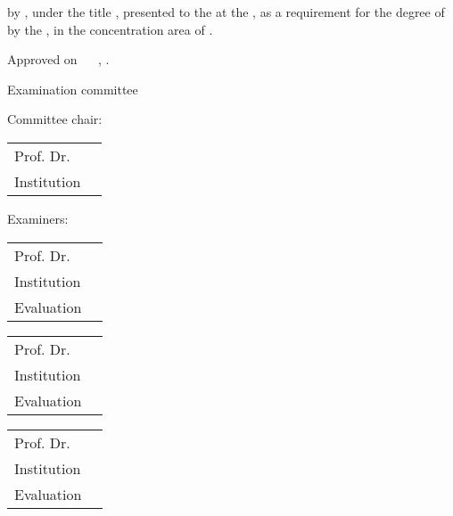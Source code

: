 
\begin{folhadeaprovacao}[\folhadeaprovacaoname]
{\imprimirtipotrabalho} by {\imprimirautor}, under the title \textbf{\imprimirtitulo}, presented to the {\imprimirescola} at the {\imprimiruniversidade}, as a requirement for the degree of {\imprimirtituloacademico} by the {\imprimirprograma}, in the concentration area of {\imprimirareadeconcentracao}.

\vspace{\hugeskipamount}
Approved on \ \underline{\hspace{5cm}} \ , \underline{\hspace{2.5cm}} .

\vspace{\hugeskipamount}
\begin{center}
  Examination committee
\end{center}

\vspace{\smallskipamount}
Committee chair:

\vspace{\tinyskipamount}
\begingroup


\setlength{\arrayrulewidth}{0pt}
\setlength{\tabcolsep}{0cm}
\begin{tabular}{m{2.5cm} P{13.5cm}}
  Prof. Dr. & \hrulefill \\
  Institution & \hrulefill \\
\end{tabular}

\vspace{\bigskipamount}
Examiners:

\vspace{\tinyskipamount}
\begin{tabular}{m{2.5cm} P{13.5cm}}
  Prof. Dr. & \hrulefill \\
  Institution & \hrulefill \\
  Evaluation & \hrulefill \\
\end{tabular}

\vspace{\smallskipamount}
\begin{tabular}{m{2.5cm} P{13.5cm}}
  Prof. Dr. & \hrulefill \\
  Institution & \hrulefill \\
  Evaluation & \hrulefill \\
\end{tabular}

\vspace{\smallskipamount}
\begin{tabular}{m{2.5cm} P{13.5cm}}
  Prof. Dr. & \hrulefill \\
  Institution & \hrulefill \\
  Evaluation & \hrulefill \\
\end{tabular}
\endgroup
\end{folhadeaprovacao}
